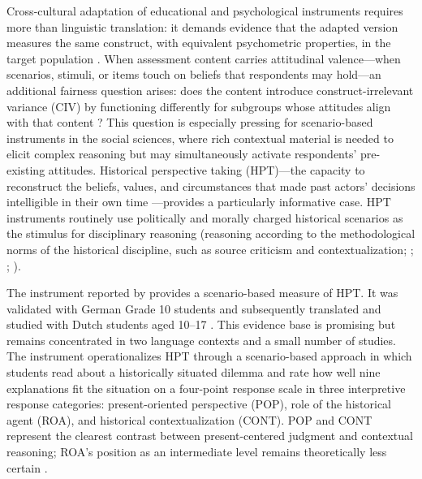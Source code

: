\documentclass[
  12pt,
]{article}
\begin{document}
Cross-cultural adaptation of educational and psychological instruments
requires more than linguistic translation: it demands evidence that
the adapted version measures the same construct, with equivalent
psychometric properties, in the target population \citep{Hambleton2005,ITC2017}. When assessment content carries
attitudinal valence---when scenarios, stimuli, or items touch on
beliefs that respondents may hold---an additional fairness question
arises: does the content introduce construct-irrelevant variance (CIV)
by functioning differently for subgroups whose attitudes align with
that content \citep{Messick1995Validity}? This question is especially pressing for
scenario-based instruments in the social sciences, where rich
contextual material is needed to elicit complex reasoning but may
simultaneously activate respondents' pre-existing attitudes.
Historical perspective taking (HPT)---the capacity to reconstruct the
beliefs, values, and circumstances that made past actors' decisions
intelligible in their own time \citep{Hartmann_Hasselhorn2008Historical,Lee_Ashby2001Empathy}---provides a particularly informative case. HPT
instruments routinely use politically and morally charged historical
scenarios as the stimulus for disciplinary reasoning (reasoning
according to the methodological norms of the historical discipline,
such as source criticism and contextualization; \citealp{VanDrie_VanBoxtel2008Historical}; \citealp{Seixas_Morton2013TheBig}; \citealp{Wineburg2001Historical}).

The instrument reported by \citet{Hartmann_Hasselhorn2008Historical} provides a
scenario-based measure of HPT. It was validated with German Grade 10
students \citep{Hartmann_Hasselhorn2008Historical} and subsequently
translated and studied with Dutch students aged 10--17
\citep{Huijgen_et_al2014Testing,Huijgen_et_al2017Toward}. This evidence
base is promising but remains concentrated in two language contexts
and a small number of studies. The instrument operationalizes HPT through a scenario-based
approach in which students read about a historically situated dilemma
and rate how well nine explanations fit the situation on a four-point
response scale in three interpretive response categories: present-oriented perspective (POP), role of the
historical agent (ROA), and historical contextualization (CONT). POP
and CONT represent the clearest contrast between present-centered
judgment and contextual reasoning; ROA's position as an intermediate
level remains theoretically less certain
\citep{Hartmann_Hasselhorn2008Historical,Lee_Ashby2001Empathy}.
\end{document}
